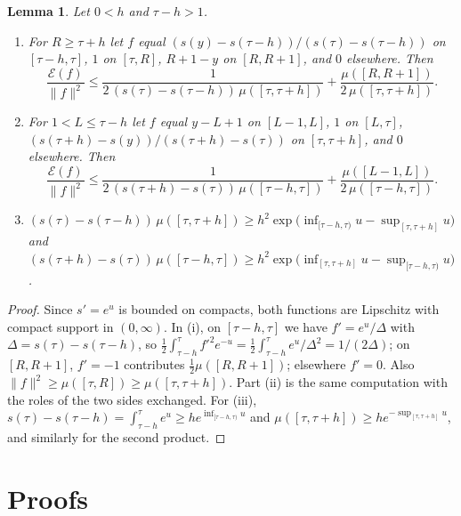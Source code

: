 \documentclass[11pt]{amsart}
\newtheorem{lemma}[theorem]{Lemma}
\theoremstyle{remark}
\newcommand{\cE}{\mathcal E}
\begin{document}
\begin{lemma}\label{lem:test}
Let $0<h$ and $\tau-h>1$.
\begin{enumerate}[label=\textup{(\roman*)}]
\item For $R\ge\tau+h$ let $f$ equal $(s(y)-s(\tau-h))/(s(\tau)-s(\tau-h))$ on $[\tau-h,\tau]$, $1$ on $[\tau,R]$, $R+1-y$ on $[R,R+1]$, and $0$ elsewhere. Then
\[
\frac{\cE(f)}{\|f\|^2}\le\frac{1}{2\,(s(\tau)-s(\tau-h))\,\mu([\tau,\tau+h])}+\frac{\mu([R,R+1])}{2\,\mu([\tau,\tau+h])}.
\]
\item For $1< L\le\tau-h$ let $f$ equal $y-L+1$ on $[L-1,L]$, $1$ on $[L,\tau]$, $(s(\tau+h)-s(y))/(s(\tau+h)-s(\tau))$ on $[\tau,\tau+h]$, and $0$ elsewhere. Then
\[
\frac{\cE(f)}{\|f\|^2}\le\frac{1}{2\,(s(\tau+h)-s(\tau))\,\mu([\tau-h,\tau])}+\frac{\mu([L-1,L])}{2\,\mu([\tau-h,\tau])}.
\]
\item $(s(\tau)-s(\tau-h))\,\mu([\tau,\tau+h])\ge h^2\exp\big(\inf_{[\tau-h,\tau)}u-\sup_{[\tau,\tau+h]}u\big)$ and $(s(\tau+h)-s(\tau))\,\mu([\tau-h,\tau])\ge h^2\exp\big(\inf_{[\tau,\tau+h]}u-\sup_{[\tau-h,\tau)}u\big)$.
\end{enumerate}
\end{lemma}

\begin{proof}
Since $s'=e^u$ is bounded on compacts, both functions are Lipschitz with compact support in $(0,\infty)$. In (i), on $[\tau-h,\tau]$ we have $f'=e^u/\Delta$ with $\Delta=s(\tau)-s(\tau-h)$, so $\frac12\int_{\tau-h}^\tau f'^2e^{-u}=\frac12\int_{\tau-h}^\tau e^{u}/\Delta^2=1/(2\Delta)$; on $[R,R+1]$, $f'=-1$ contributes $\frac12\mu([R,R+1])$; elsewhere $f'=0$. Also $\|f\|^2\ge\mu([\tau,R])\ge\mu([\tau,\tau+h])$. Part (ii) is the same computation with the roles of the two sides exchanged. For (iii), $s(\tau)-s(\tau-h)=\int_{\tau-h}^\tau e^u\ge he^{\inf_{[\tau-h,\tau)}u}$ and $\mu([\tau,\tau+h])\ge he^{-\sup_{[\tau,\tau+h]}u}$, and similarly for the second product.
\end{proof}

\section{Proofs}\label{sec:proof}
\end{document}
